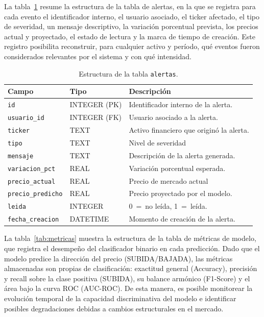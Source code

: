 La tabla~\ref{tab:alertas} resume la estructura de la tabla de alertas, en la
que se registra para cada evento el identificador interno, el usuario asociado,
el ticker afectado, el tipo de severidad, un mensaje descriptivo, la
variación porcentual prevista, los precios actual y proyectado, el estado de
lectura y la marca de tiempo de creación. Este registro posibilita reconstruir,
para cualquier activo y período, qué eventos fueron considerados relevantes por
el sistema y con qué intensidad.

\begin{table}[h]
\centering
\caption{Estructura de la tabla \texttt{alertas}.}
\label{tab:alertas}
\begin{tabular}{lll}
\toprule
\textbf{Campo} & \textbf{Tipo} & \textbf{Descripción} \\
\midrule
\texttt{id}               & INTEGER (PK) & Identificador interno de la alerta. \\
\texttt{usuario\_id}      & INTEGER (FK) & Usuario asociado a la alerta. \\
\texttt{ticker}           & TEXT         & Activo financiero que originó la alerta. \\
\texttt{tipo}             & TEXT         & Nivel de severidad \\
\texttt{mensaje}          & TEXT         & Descripción de la alerta generada. \\
\texttt{variacion\_pct}   & REAL         & Variación porcentual esperada. \\
\texttt{precio\_actual}   & REAL         & Precio de mercado actual \\
\texttt{precio\_predicho} & REAL         & Precio proyectado por el modelo. \\
\texttt{leida}            & INTEGER      & 0~=~no leída, 1~=~leída. \\
\texttt{fecha\_creacion}  & DATETIME     & Momento de creación de la alerta. \\
\bottomrule
\end{tabular}
\end{table}

La tabla~\ref{tab:metricas} muestra la estructura de la tabla de métricas de
modelo, que registra el desempeño del clasificador binario en cada predicción.
Dado que el modelo predice la dirección del precio (SUBIDA/BAJADA), las métricas
almacenadas son propias de clasificación: exactitud general (Accuracy),
precisión y recall sobre la clase positiva (SUBIDA), su balance armónico
(F1-Score) y el área bajo la curva ROC (AUC-ROC). De esta manera, es posible
monitorear la evolución temporal de la capacidad discriminativa del modelo e
identificar posibles degradaciones debidas a cambios estructurales en el mercado.

